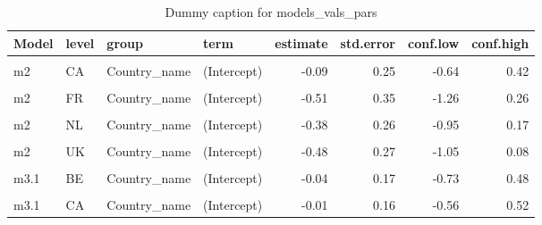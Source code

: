 \begin{table}
\centering
\caption{Dummy caption for models_vals_pars}
\centering
\fontsize{10}{12}\selectfont
\begin{tabular}[t]{llllrrrr}
\toprule
Model & level & group & term & estimate & std.error & conf.low & conf.high\\
\midrule
\cellcolor{gray!10}{m2} & \cellcolor{gray!10}{BE} & \cellcolor{gray!10}{Country\_name} & \cellcolor{gray!10}{(Intercept)} & \cellcolor{gray!10}{-0.35} & \cellcolor{gray!10}{0.26} & \cellcolor{gray!10}{-0.91} & \cellcolor{gray!10}{0.16}\\
m2 & CA & Country\_name & (Intercept) & -0.09 & 0.25 & -0.64 & 0.42\\
\cellcolor{gray!10}{m2} & \cellcolor{gray!10}{CH} & \cellcolor{gray!10}{Country\_name} & \cellcolor{gray!10}{(Intercept)} & \cellcolor{gray!10}{0.38} & \cellcolor{gray!10}{0.31} & \cellcolor{gray!10}{-0.26} & \cellcolor{gray!10}{1.12}\\
m2 & FR & Country\_name & (Intercept) & -0.51 & 0.35 & -1.26 & 0.26\\
\cellcolor{gray!10}{m2} & \cellcolor{gray!10}{IL} & \cellcolor{gray!10}{Country\_name} & \cellcolor{gray!10}{(Intercept)} & \cellcolor{gray!10}{-0.09} & \cellcolor{gray!10}{0.53} & \cellcolor{gray!10}{-1.34} & \cellcolor{gray!10}{1.07}\\
m2 & NL & Country\_name & (Intercept) & -0.38 & 0.26 & -0.95 & 0.17\\
\cellcolor{gray!10}{m2} & \cellcolor{gray!10}{SE} & \cellcolor{gray!10}{Country\_name} & \cellcolor{gray!10}{(Intercept)} & \cellcolor{gray!10}{0.99} & \cellcolor{gray!10}{0.26} & \cellcolor{gray!10}{0.44} & \cellcolor{gray!10}{1.61}\\
m2 & UK & Country\_name & (Intercept) & -0.48 & 0.27 & -1.05 & 0.08\\
\cellcolor{gray!10}{m2} & \cellcolor{gray!10}{US} & \cellcolor{gray!10}{Country\_name} & \cellcolor{gray!10}{(Intercept)} & \cellcolor{gray!10}{0.52} & \cellcolor{gray!10}{0.26} & \cellcolor{gray!10}{-0.05} & \cellcolor{gray!10}{1.06}\\
m3.1 & BE & Country\_name & (Intercept) & -0.04 & 0.17 & -0.73 & 0.48\\
\cellcolor{gray!10}{m3.1} & \cellcolor{gray!10}{BE} & \cellcolor{gray!10}{Country\_name} & \cellcolor{gray!10}{EPS} & \cellcolor{gray!10}{-0.10} & \cellcolor{gray!10}{0.10} & \cellcolor{gray!10}{-0.34} & \cellcolor{gray!10}{0.12}\\
m3.1 & CA & Country\_name & (Intercept) & -0.01 & 0.16 & -0.56 & 0.52\\

\end{tabular}
\end{table}
